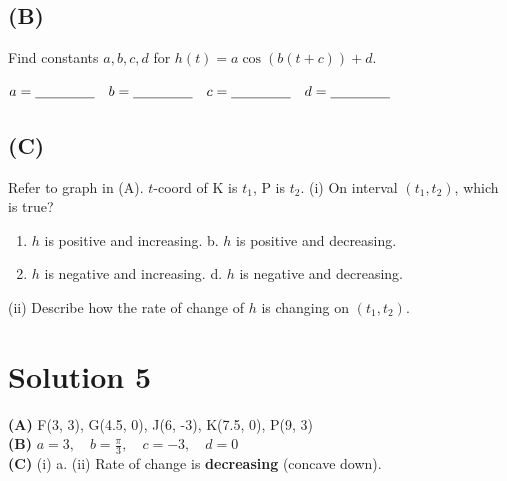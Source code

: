 \documentclass[12pt]{article}
\begin{document}
\subsection*{(B)}
Find constants $a, b, c, d$ for $h(t) = a \cos(b(t+c)) + d$.

\vspace{0.5em}
$a = \underline{\hspace{1.5cm}} \quad b = \underline{\hspace{1.5cm}} \quad c = \underline{\hspace{1.5cm}} \quad d = \underline{\hspace{1.5cm}}$

\subsection*{(C)}
Refer to graph in (A). $t$-coord of K is $t_1$, P is $t_2$.
(i) On interval $(t_1, t_2)$, which is true?
\begin{enumerate}[label=\alph*.]
    \item $h$ is positive and increasing. \hfill b. $h$ is positive and decreasing.
    \item $h$ is negative and increasing. \hfill d. $h$ is negative and decreasing.
\end{enumerate}
(ii) Describe how the rate of change of $h$ is changing on $(t_1, t_2)$.
\vspace{1.5cm}

\newpage
\section*{Solution 5}
\textbf{(A)} F(3, 3), G(4.5, 0), J(6, -3), K(7.5, 0), P(9, 3) \\
\textbf{(B)} $a = 3, \quad b = \frac{\pi}{3}, \quad c = -3, \quad d = 0$ \\
\textbf{(C)} (i) a. (ii) Rate of change is \textbf{decreasing} (concave down).
\end{document}
